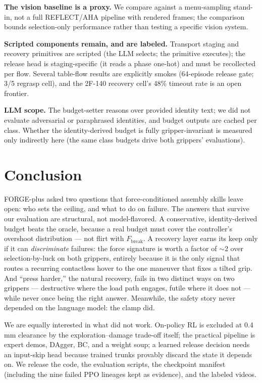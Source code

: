 \documentclass[11pt]{article}
\newcommand{\Fbreak}{\ensuremath{F_{\mathrm{break}}}}
\begin{document}
\textbf{The vision baseline is a proxy.} We compare against a menu-sampling stand-in, not a full REFLECT/AHA pipeline with rendered frames; the comparison bounds selection-only performance rather than testing a specific vision system.

\textbf{Scripted components remain, and are labeled.} Transport staging and recovery primitives are scripted (the LLM selects; the primitive executes); the release head is staging-specific (it reads a phase one-hot) and must be recollected per flow. Several table-flow results are explicitly smokes (64-episode release gate; 3/5 regrasp cell), and the 2F-140 recovery cell's 48\% timeout rate is an open frontier.

\textbf{LLM scope.} The budget-setter reasons over provided identity text; we did not evaluate adversarial or paraphrased identities, and budget outputs are cached per class. Whether the identity-derived budget is fully gripper-invariant is measured only indirectly here (the same class budgets drive both grippers' evaluations).

\section{Conclusion}

FORGE-plus asked two questions that force-conditioned assembly skills leave open: who sets the ceiling, and what to do on failure. The answers that survive our evaluation are structural, not model-flavored. A conservative, identity-derived budget beats the oracle, because a real budget must cover the controller's overshoot distribution --- not flirt with \Fbreak{}. A recovery layer earns its keep only if it can \emph{discriminate} failures: the force signature is worth a factor of $\sim$2 over selection-by-luck on both grippers, entirely because it is the only signal that routes a recurring contactless hover to the one maneuver that fixes a tilted grip. And ``press harder,'' the natural recovery, fails in two distinct ways on two grippers --- destructive where the load path engages, futile where it does not --- while never once being the right answer. Meanwhile, the safety story never depended on the language model: the clamp did.

We are equally interested in what did not work. On-policy RL is excluded at 0.4\,mm clearance by the exploration--damage trade-off itself; the practical pipeline is expert demos, DAgger, BC, and a weight soup; a learned release decision needs an input-skip head because trained trunks provably discard the state it depends on. We release the code, the evaluation scripts, the checkpoint manifest (including the nine failed PPO lineages kept as evidence), and the labeled videos.



\end{document}
